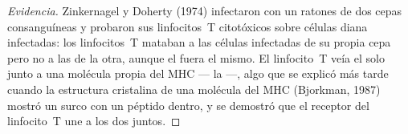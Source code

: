 \begin{proof}[Evidencia]
Zinkernagel y Doherty (1974) infectaron con un  ratones de dos cepas
consanguíneas y probaron sus linfocitos~T citotóxicos sobre células diana
infectadas: los linfocitos~T mataban a las células infectadas de su
propia cepa pero no a las de la otra, aunque el  fuera el mismo. El
linfocito~T veía el  solo junto a una molécula propia del MHC --- la
\emph{} ---, algo que se explicó más tarde cuando la
estructura cristalina de una molécula del MHC (Bjorkman, 1987) mostró un
surco con un péptido dentro, y se demostró que el receptor del
linfocito~T une a los dos juntos.
\end{proof}


